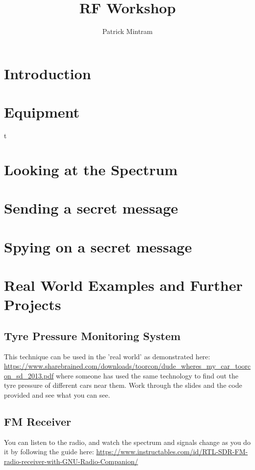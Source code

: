 \documentclass[titlepage,a4paper]{article}
\begin{document}
\title{RF Workshop}
\author{Patrick Mintram}
\maketitle

\tableofcontents
\listoffigures
\newpage

\section{Introduction}

\newpage

\section{Equipment}
t
\newpage

\section{Looking at the Spectrum}

\newpage

\section{Sending a secret message}

\newpage

\section{Spying on a secret message}

\newpage

\section{Real World Examples and Further Projects}
\subsection{Tyre Pressure Monitoring System}
This technique can be used in the 'real world' as demonstrated here: \url{https://www.sharebrained.com/downloads/toorcon/dude\_wheres\_my\_car\_toorcon\_sd\_2013.pdf} where someone has used the same technology to find out the tyre pressure of different cars near them. Work through the slides and the code provided and see what you can see.

\subsection{FM Receiver}
You can listen to the radio, and watch the spectrum and signals change as you do it by following the guide here: \url{https://www.instructables.com/id/RTL-SDR-FM-radio-receiver-with-GNU-Radio-Companion/}
\end{document}
